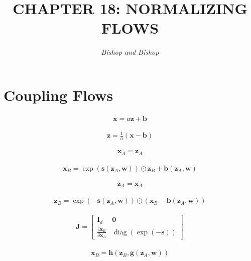 \documentclass{article}
\title{\LARGE\scshape\MakeUppercase{Chapter 18: Normalizing Flows}}
\author{\textit{Bishop and Bishop}}
\date{}
\begin{document}
\maketitle

\section{Coupling Flows}

\begin{align*}
\mathbf{x} = a \mathbf{z} + \mathbf{b} 
\tag{18.8}
\end{align*}

\begin{align*}
\mathbf{z} = \frac{1}{a}(\mathbf{x} - \mathbf{b}) 
\tag{18.9}
\end{align*}

\begin{align*}
\mathbf{x}_{A} = \mathbf{z}_{A} 
\tag{18.10}
\end{align*}

\begin{align*}
\mathbf{x}_{B} = \exp \left(\mathbf{s}\left(\mathbf{z}_{A}, \mathbf{w}\right)\right) \odot \mathbf{z}_{B} + \mathbf{b}\left(\mathbf{z}_{A}, \mathbf{w}\right) 
\tag{18.11}
\end{align*}

\begin{align*}
\mathbf{z}_{A} = \mathbf{x}_{A} 
\tag{18.12}
\end{align*}

\begin{align*}
\mathbf{z}_{B} = \exp \left(-\mathbf{s}\left(\mathbf{z}_{A}, \mathbf{w}\right)\right) \odot \left(\mathbf{x}_{B} - \mathbf{b}\left(\mathbf{z}_{A}, \mathbf{w}\right)\right) 
\tag{18.13}
\end{align*}

\begin{align*}
\mathbf{J} = \left[
\begin{array}{cc}
\mathbf{I}_{d} & \mathbf{0}  \\
\frac{\partial \mathbf{z}_{B}}{\partial \mathbf{x}_{A}} & \operatorname{diag}(\exp(-\mathbf{s}))
\end{array}
\right] 
\tag{18.14}
\end{align*}

\begin{align*}
\mathbf{x}_{B} = \mathbf{h}\left(\mathbf{z}_{B}, \mathbf{g}\left(\mathbf{z}_{A}, \mathbf{w}\right)\right) 
\tag{18.15}
\end{align*}
\end{document}
